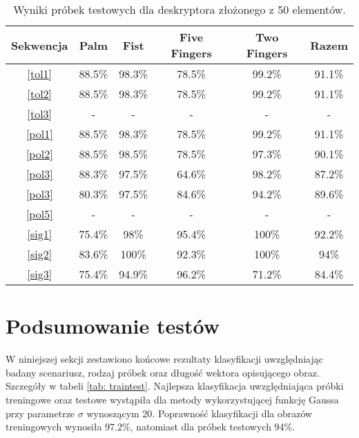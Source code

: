 \begin{table} [h!]
	\centering
	\begin{tabular}{|c|c|c|c|c|c|}
		\hline
		\textbf{Sekwencja} 	& \textbf{Palm} & \textbf{Fist} & \textbf{Five Fingers} & \textbf{Two Fingers} & \textbf{Razem} \\ \hline
		\ref{tol1} 	& 88.5\% 	& 98.3\%	& 78.5\%	& 99.2\% 	& 91.1\% \\ \hline
		\ref{tol2} 	& 88.5\% 	& 98.3\%	& 78.5\%	& 99.2\% 	& 91.1\% \\ \hline
		\ref{tol3}	& -			& -			& -			& - 		& - 	 \\ \hline \hline
		\ref{pol1} 	& 88.5\% 	& 98.3\%	& 78.5\%	& 99.2\% 	& 91.1\% \\ \hline
		\ref{pol2} 	& 88.5\% 	& 98.5\%	& 78.5\%	& 97.3\% 	& 90.1\% \\ \hline
		\ref{pol3}	& 88.3\%	& 97.5\%	& 64.6\%	& 98.2\% 	& 87.2\% \\ \hline
		\ref{pol3}	& 80.3\%	& 97.5\%	& 84.6\%	& 94.2\% 	& 89.6\% \\ \hline
		\ref{pol5}	& -			& -			& -			& - 		& - 	 \\ \hline \hline
		\ref{sig1}	& 75.4\% 	& 98\%		& 95.4\%	& 100\% 	& 92.2\% \\ \hline
		\ref{sig2}	& 83.6\% 	& 100\%		& 92.3\%	& 100\% 	& 94\% \\ \hline
		\ref{sig3}	& 75.4\%	& 94.9\%	& 96.2\%	& 71.2\% 	& 84.4\% \\ \hline
	\end{tabular}
	\caption{Wyniki próbek testowych dla deskryptora złożonego z 50 elementów.}
	\label{tab: test50}
\end{table}




\section{Podsumowanie testów}
W niniejszej sekcji zestawiono końcowe rezultaty klasyfikacji uwzględniając badany scenariusz, rodzaj próbek oraz długość wektora opisującego obraz. Szczegóły w tabeli \ref{tab: traintest}.
Najlepsza klasyfikacja uwzględniająca próbki treningowe oraz testowe wystąpiła dla metody wykorzystującej funkcję Gaussa przy parametrze $\sigma$ wynoszącym 20. Poprawność klasyfikacji dla obrazów treningowych wynosiła 97.2\%, natomiast dla próbek testowych 94\%. 

